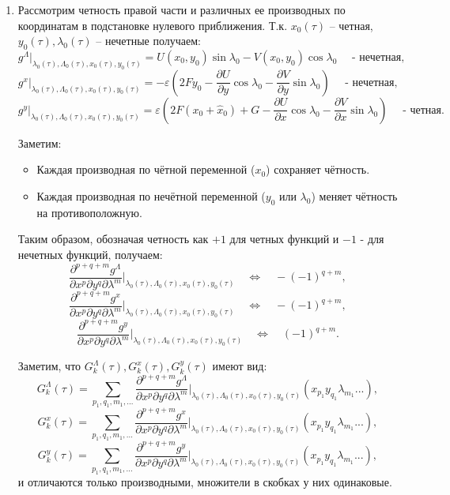 \begin{enumerate}
\item Рассмотрим четность правой части и различных ее производных по координатам в подстановке нулевого приближения.
Т.к. $x_0(\tau)$ -- четная, $y_0(\tau), \lambda_0(\tau)$ -- нечетные получаем:
$$g^\Lambda|_{\lambda_0(\tau),\Lambda_0(\tau),x_0(\tau),y_0(\tau)} = U(x_0,y_0)\sin\lambda_0-V(x_0,y_0)\cos\lambda_0 \quad \text{ - нечетная},$$
$$g^x|_{\lambda_0(\tau),\Lambda_0(\tau),x_0(\tau),y_0(\tau)} = -\varepsilon \left( 2Fy_0-\frac{\partial U}{\partial y} \cos \lambda_0 - \frac{\partial V}{\partial y} \sin \lambda_0 \right) \quad \text{ - нечетная},$$
$$g^y|_{\lambda_0(\tau),\Lambda_0(\tau),x_0(\tau),y_0(\tau)} = \varepsilon \left( 2F(x_0+\hat x_0)+G -\frac{\partial U}{\partial x} \cos \lambda_0 - \frac{\partial V}{\partial x} \sin \lambda_0 \right) \quad \text{ - четная}.$$

Заметим:
\begin{itemize}
    \item Каждая производная по чётной переменной ($x_0$) сохраняет чётность.
    \item Каждая производная по нечётной переменной ($y_0$ или $\lambda_0$) меняет чётность на противоположную.
\end{itemize}
Таким образом, обозначая четность как $+1$ для четных функций и  $-1$ -  для нечетных функций, получаем:
$$\frac{\partial^{p+q+m}g^\Lambda}{\partial x^p \partial y^q \partial \lambda^m}\bigg|_{\lambda_0(\tau),\Lambda_0(\tau),x_0(\tau),y_0(\tau)} \quad \Leftrightarrow \quad -(-1)^{q+m},$$
\begin{equation}
\frac{\partial^{p+q+m}g^x}{\partial x^p \partial y^q \partial \lambda^m}\bigg|_{\lambda_0(\tau),\Lambda_0(\tau),x_0(\tau),y_0(\tau)} \quad \Leftrightarrow \quad -(-1)^{q+m}, \label{chetnost}
\end{equation}
$$\frac{\partial^{p+q+m}g^y}{\partial x^p \partial y^q \partial \lambda^m}\bigg|_{\lambda_0(\tau),\Lambda_0(\tau),x_0(\tau),y_0(\tau)} \quad \Leftrightarrow \quad (-1)^{q+m}.$$

Заметим, что $G_k^\Lambda(\tau),G_k^x(\tau),G_k^y(\tau)$ имеют вид:
$$G_k^\Lambda(\tau) = \sum_{p_1,q_1,m_1,...} \frac{\partial^{p+q+m}g^\Lambda}{\partial x^p \partial y^q \partial \lambda^m}\bigg|_{\lambda_0(\tau),\Lambda_0(\tau),x_0(\tau),y_0(\tau)} (x_{p_1}y_{q_1}\lambda_{m_1}...),$$
$$G_k^x(\tau) = \sum_{p_1,q_1,m_1,...} \frac{\partial^{p+q+m}g^x}{\partial x^p \partial y^q \partial \lambda^m}\bigg|_{\lambda_0(\tau),\Lambda_0(\tau),x_0(\tau),y_0(\tau)} (x_{p_1}y_{q_1}\lambda_{m_1}...),$$
$$G_k^y(\tau) = \sum_{p_1,q_1,m_1,...} \frac{\partial^{p+q+m}g^y}{\partial x^p \partial y^q \partial \lambda^m}\bigg|_{\lambda_0(\tau),\Lambda_0(\tau),x_0(\tau),y_0(\tau)} (x_{p_1}y_{q_1}\lambda_{m_1}...),$$
и отличаются только производными, множители в скобках у них одинаковые.


\end{enumerate}
